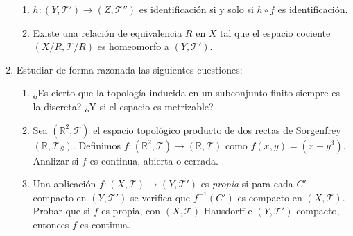 \documentclass[fleqn]{article}
\begin{document}
\begin{enumerate}
        \begin{enumerate}
          \item $h : (Y, \mathcal{T}') \longrightarrow (Z, \mathcal{T}'')$ es identificación si y solo si $h \circ f$ es identificación.
          \item Existe una relación de equivalencia $R$ en $X$ tal que el espacio cociente $(X/R, \mathcal{T}/R)$ es homeomorfo a $(Y, \mathcal{T}')$.
        \end{enumerate}

  \item Estudiar de forma razonada las siguientes cuestiones:

        \begin{enumerate}
          \item ¿Es cierto que la topología inducida en un subconjunto finito siempre es la discreta? ¿Y si el espacio es metrizable?
          \item Sea $(\mathbb{R}^2, \mathcal{T})$ el espacio topológico producto de dos rectas de Sorgenfrey $(\mathbb{R}, \mathcal{T}_S)$. Definimos $f : (\mathbb{R}^2, \mathcal{T}) \longrightarrow (\mathbb{R}, \mathcal{T})$ como $f(x, y) = (x -y^3)$. Analizar si $f$ es continua, abierta o cerrada.
          \item Una aplicación $f : (X, \mathcal{T}) \longrightarrow (Y, \mathcal{T}')$ es \textit{propia} si para cada $C'$ compacto en $(Y, \mathcal{T}')$ se verifica que $f^{-1}(C')$ es compacto en $(X, \mathcal{T})$. Probar que si $f$ es propia, con $(X, \mathcal{T})$ Hausdorff e $(Y, \mathcal{T}')$ compacto, entonces $f$ es continua.
        \end{enumerate}

\end{enumerate}
\end{document}
